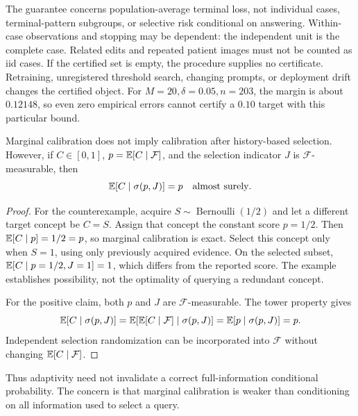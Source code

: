 The guarantee concerns population-average terminal loss, not individual
cases, terminal-pattern subgroups, or selective risk conditional on
answering. Within-case observations and stopping may be dependent:
the independent unit is the complete case. Related edits and repeated
patient images must not be counted as iid cases. If the certified set is
empty, the procedure supplies no certificate. Retraining, unregistered
threshold search, changing prompts, or deployment drift changes the
certified object. For $M=20,\delta=0.05,n=203$, the margin is about
$0.12148$, so even zero empirical errors cannot certify a $0.10$ target
with this particular bound.

\begin{acamprop}
\label{prop:acam-selection}
Marginal calibration does not imply calibration after history-based
selection. However, if $C\in[0,1]$,
$p=\mathbb{E}[C\mid\mathcal F]$, and the selection indicator $J$ is
$\mathcal F$-measurable, then
\[
 \mathbb{E}[C\mid\sigma(p,J)]=p\quad\text{almost surely}.
\]
\end{acamprop}

\begin{proof}
For the counterexample, acquire $S\sim\operatorname{Bernoulli}(1/2)$
and let a different target concept be $C=S$. Assign that concept the
constant score $p=1/2$. Then $\mathbb{E}[C\mid p]=1/2=p$, so marginal
calibration is exact. Select this concept only when $S=1$, using only
previously acquired evidence. On the selected subset,
$\mathbb{E}[C\mid p=1/2,J=1]=1$, which differs from the reported score.
The example establishes possibility, not the optimality of querying a
redundant concept.

For the positive claim, both $p$ and $J$ are $\mathcal F$-measurable.
The tower property gives
\[
 \mathbb{E}[C\mid\sigma(p,J)]
 =\mathbb{E}[\mathbb{E}[C\mid\mathcal F]\mid\sigma(p,J)]
 =\mathbb{E}[p\mid\sigma(p,J)]=p.
\]
Independent selection randomization can be incorporated into
$\mathcal F$ without changing $\mathbb{E}[C\mid\mathcal F]$.
\end{proof}

Thus adaptivity need not invalidate a correct full-information
conditional probability. The concern is that marginal calibration is
weaker than conditioning on all information used to select a query.

